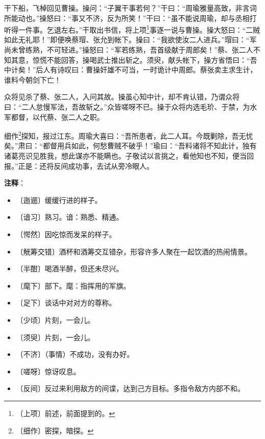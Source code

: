 \documentclass[12pt,UTF-8,openany]{ctexbook}
\begin{document}
\begin{large}
    干下船，飞棹回见曹操。操问：“子翼干事若何？”干曰：“周瑜雅量高致，非言词所能动也。”操怒曰：“事又不济，反为所笑！”干曰：“虽不能说周瑜，却与丞相打听得一件事。乞退左右。”干取出书信，将上项\footnote{〔上项〕前述，前面提到的。}事逐一说与曹操。操大怒曰：“二贼如此无礼耶！”即便唤蔡瑁、张允到帐下。操曰：“我欲使汝二人进兵。”瑁曰：“军尚未曾练熟，不可轻进。”操怒曰：“军若练熟，吾首级献于周郎矣！”蔡、张二人不知其意，惊慌不能回答，操喝武士推出斩之。须臾，献头帐下，操方省悟曰：“吾中计矣！”后人有诗叹曰：曹操奸雄不可当，一时诡计中周郎。蔡张卖主求生计，谁料今朝剑下亡！
    
    众将见杀了蔡、张二人，入问其故。操虽心知中计，却不肯认错，乃谓众将曰：“二人怠慢军法，吾故斩之。”众皆嗟呀不已。操于众将内选毛玠、于禁，为水军都督，以代蔡、张二人之职。
    
    细作\footnote{〔细作〕密探，暗探。}探知，报过江东。周瑜大喜曰：“吾所患者，此二人耳。今既剿除，吾无忧矣。”肃曰：“都督用兵如此，何愁曹贼不破乎！”瑜曰：“吾料诸将不知此计，独有诸葛亮识见胜我，想此谋亦不能瞒也。子敬试以言挑之，看他知也不知，便当回报。”正是：还将反间成功事，去试从旁冷眼人。
    
\end{large}


\newpage

\textbf{注释}：

\vspace{-1em}

\begin{itemize}
    \setlength\itemsep{-0.2em}
    \item 〔迤逦〕缓缓行进的样子。
    \item 〔谙习〕熟习。谙：熟悉、精通。
    \item 〔愕然〕因吃惊而发呆的样子。
    \item 〔觥筹交错〕酒杯和酒筹交互错杂，形容许多人聚在一起饮酒的热闹情景。
    \item 〔半酣〕喝酒半醉，但还未尽兴。
    \item 〔麾下〕部下。麾：指挥用的军旗。
    \item 〔足下〕谈话中对对方的尊称。
    \item 〔少顷〕片刻，一会儿。
    \item 〔须臾〕片刻，一会儿。
    \item 〔不济〕（事情）不成功，没有办好。
    \item 〔嗟呀〕惊讶叹息。
    \item 〔反间〕反过来利用敌方的间谍，达到己方目标。多指令敌方内部不和。
\end{itemize}
\end{document}
